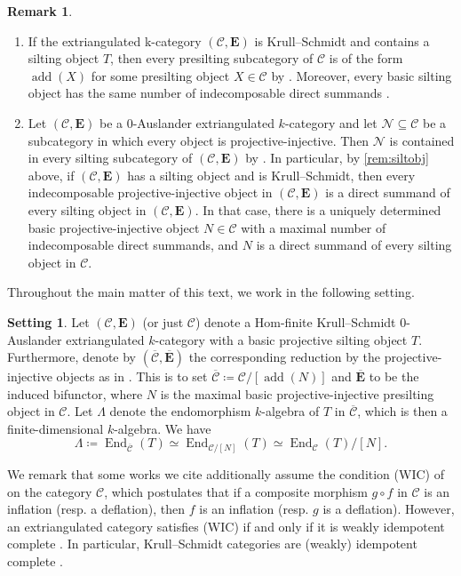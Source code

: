 \documentclass[10pt,twoside, a4paper,reqno]{amsart}
\DeclareMathOperator{\End}{End}
\DeclareMathOperator{\add}{add}
\newcommand{\calN}{\mathcal{N}}
\newcommand{\calC}{\mathcal{C}}
\newcommand{\E}{\mathbf{E}}
\theoremstyle{definition}
\newtheorem{setup}[theorem]{Setting}
\newtheorem{remark}[theorem]{Remark}
\begin{document}
\begin{remark}\label{rem:silt}
\begin{enumerate}
    \item\label{rem:siltobj} If the extriangulated k-category $(\calC,\E)$ is Krull--Schmidt and contains a silting object $T$, then every presilting subcategory of $\calC$ is of the form $\add(X)$ for some presilting object $X\in\calC$ {by} \cite[Prop. 5.4]{AT22}. Moreover, every basic silting object has the same number of indecomposable direct summands \cite[Cor. 4.2]{AT23}. 
    \item\label{rem:proj-inj-silt}
    Let $(\calC,\E)$ be a 0-Auslander extriangulated $k$-category and let $\calN\subseteq \calC$ be a subcategory in which every object is {projective}-injective. Then $\calN$ is contained in every silting subcategory of $(\calC,\E)$ {by} \cite[Rem. 4.4(d)]{GNP23}. In particular, by \eqref{rem:siltobj} above, if $(\calC,\E)$ has a silting object and is Krull--Schmidt, then every {indecomposable} projective-injective object in $(\calC,\E)$ is a direct summand of every silting object in $(\calC,\E)$. In that case, there is a uniquely determined basic projective-injective object $N\in \calC$ with a maximal number of indecomposable direct summands, and $N$ is a direct summand of every silting object in $\calC$.
\end{enumerate}
\end{remark}

Throughout the main matter of this text, we work in the following setting.

\begin{setup}\label{setting}
    Let $(\calC,\E)$ (or just $\calC$) denote a Hom-finite Krull--Schmidt 0-Auslander extriangulated $k$-category with a basic projective silting object $T$. Furthermore, denote by $(\overline{\calC},\overline{\E})$ the corresponding reduction by the projective-injective objects {as in \cite[Prop. 3.30]{NP19}}. This is to set $\overline{\calC}\coloneqq {\calC}/[{\add(N)}]$ and $\overline{\E}$ to be the induced bifunctor, where $N$ is the maximal basic projective-injective presilting object in $\calC$. Let $\Lambda$ denote the endomorphism $k$-algebra of $T$ in $\overline{\calC}$, which is then a finite-dimensional $k$-algebra. We have
    \[ \Lambda \coloneqq \End_{\overline{\calC}}(T) \simeq  \End_{\calC/[N]}(T) \simeq \End_{\calC}(T)/[N]. \]
\end{setup}

We remark that some works we cite additionally assume the condition (WIC) of \cite[Cond. 5.8]{NP19} on the category $\calC$, which postulates that if a composite morphism $g \circ f$ in $\calC$ is an inflation (resp. a deflation), then $f$ is an inflation (resp. $g$ is a deflation). However, an extriangulated category satisfies (WIC) if and only if it is weakly idempotent complete \cite[Prop. C]{Kla22}. In particular, Krull--Schmidt categories are (weakly) idempotent complete \cite[Cor. 4.4]{Kra15}.
\end{document}
